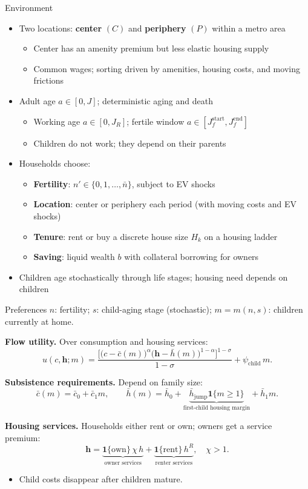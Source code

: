 \documentclass[11pt,aspectratio=169]{beamer}
\begin{document}
\begin{frame}{Environment}
\begin{itemize}
  \item Two locations: \textbf{center} $(C)$ and \textbf{periphery} $(P)$ within a metro area
  \begin{itemize}
    \item Center has an amenity premium but less elastic housing supply
    \item Common wages; sorting driven by amenities, housing costs, and moving frictions
  \end{itemize}
  \item Adult age $a \in [0,J]$; deterministic aging and death
  \begin{itemize}
    \item Working age $a \in [0, J_R]$; fertile window $a \in [J_f^{\mathrm{start}}, J_f^{\mathrm{end}}]$
    \item Children do not work; they depend on their parents
  \end{itemize}
  \item Households choose:
  \begin{itemize}
    \item \textbf{Fertility}: $n' \in \{0,1,\ldots,\bar n\}$, subject to EV shocks
    \item \textbf{Location}: center or periphery each period (with moving costs and EV shocks)
    \item \textbf{Tenure}: rent or buy a discrete house size $H_k$ on a housing ladder
    \item \textbf{Saving}: liquid wealth $b$ with collateral borrowing for owners
  \end{itemize}
  \item Children age stochastically through life stages; housing need depends on children
\end{itemize}
\end{frame}

\begin{frame}{Preferences}
\small
$n$: fertility; $s$: child-aging stage (stochastic); $m = m(n,s)$: children currently at home.

\medskip
\textbf{Flow utility.} Over consumption and housing services:
\[
u(c,\mathbf h;m)
= \frac{\Big[\big(c-\bar c(m)\big)^\alpha \big(\mathbf h-\bar h(m)\big)^{1-\alpha}\Big]^{1-\sigma}}{1-\sigma}
+ \psi_{\mathrm{child}}\,m.
\]

\textbf{Subsistence requirements.} Depend on family size:
\[
\bar c(m)=\bar c_0+\bar c_1 m,
\qquad
\bar h(m)=\bar h_0+\underbrace{\bar h_{\mathrm{jump}}\mathbf{1}\{m\geq 1\}}_{\text{first-child housing margin}}+\bar h_1 m.
\]

\textbf{Housing services.} Households either rent or own; owners get a service premium:
\[
\mathbf h = \underbrace{\mathbf{1}\{\text{own}\}\,\chi\, h}_{\text{owner services}} + \underbrace{\mathbf{1}\{\text{rent}\}\,h^R}_{\text{renter services}}, \quad \chi > 1.
\]

\begin{itemize}
  \item Child costs disappear after children mature.
\end{itemize}
\end{frame}
\end{document}
